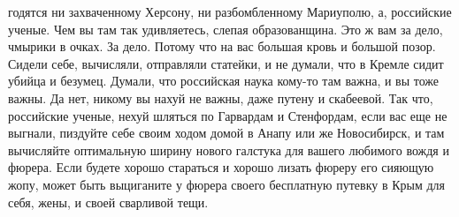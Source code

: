годятся ни захваченному Херсону, ни разбомбленному Мариуполю, а, российские
ученые. Чем вы там так удивляетесь, слепая образованщина. Это ж вам за дело,
чмырики  в очках. За дело. Потому что на вас большая кровь и большой позор.
Сидели себе, вычисляли, отправляли статейки, и не думали, что в Кремле сидит
убийца и безумец. Думали, что российская наука кому-то там важна, и вы тоже
важны. Да нет, никому вы нахуй не важны, даже путену и скабеевой. Так что,
российские ученые, нехуй шляться по Гарвардам и Стенфордам, если вас еще не
выгнали, пиздуйте себе своим ходом домой в Анапу или же Новосибирск, и там
вычисляйте оптимальную ширину нового галстука для вашего любимого вождя и
фюрера. Если будете хорошо стараться и хорошо лизать фюреру его сияющую жопу,
может быть выциганите у фюрера своего бесплатную путевку в Крым для себя, жены,
и своей сварливой тещи.
